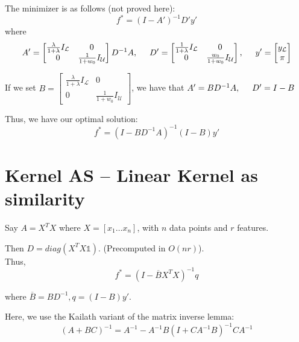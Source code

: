 \documentclass[12pt]{article}
\renewcommand{\L}{\mathcal{L}}
\newcommand{\U}{\mathcal{U}}
\newcommand{\inv}[1]{#1^{-1}}
\begin{document}
		The minimizer is as follows (not proved here): 
		\begin{equation}
			f^* = \inv{(I-A')} D' y'
		\end{equation}
		where 
		$$A' = \left[\begin{matrix} \frac{\lambda}{1+\lambda}I_\L & 0 \\ 0 & \frac{1}{1+w_0}I_\U \end{matrix}\right] \inv{D} A,\hspace{5mm}
		  D' = \left[\begin{matrix} \frac{1}{1+\lambda}I_\L & 0 \\ 0 & \frac{w_0}{1+w_0}I_\U \end{matrix}\right],\hspace{5mm}
		  y' = \left[\begin{matrix} y_\L \\ \pi \end{matrix} \right]
		$$

		If we set $B = \left[\begin{matrix} \frac{\lambda}{1+\lambda}I_\L & 0 \\ 0 & \frac{1}{1+w_0}I_\U \end{matrix}\right]$, we have that $A' = B\inv D A, \hspace{5mm} D' = I-B$

		Thus, we have our optimal solution: 
		\begin{equation}
			f^* = \inv{(I - B\inv D A)}(I-B)y'
		\end{equation}

	\section{Kernel AS -- Linear Kernel as similarity}

		Say $A = X^T X$ where $X = [x_1 \hdots x_n]$, with $n$ data points and $r$ features.

		Then $D = diag (X^T X \mathbb{1})$. (Precomputed in $O(nr)$).\\

		Thus, 
		\begin{equation}
			f^* = \inv{(I - \overline{B} X^TX)}q
		\end{equation}

		where $\overline{B} = B \inv{D}, q = (I-B)y'$.

		Here, we use the Kailath variant of the matrix inverse lemma:
		$$\inv{(A+BC)} = \inv{A} -  \inv{A}B\inv{(I+C\inv{A}B)}C\inv{A}$$
\end{document}
